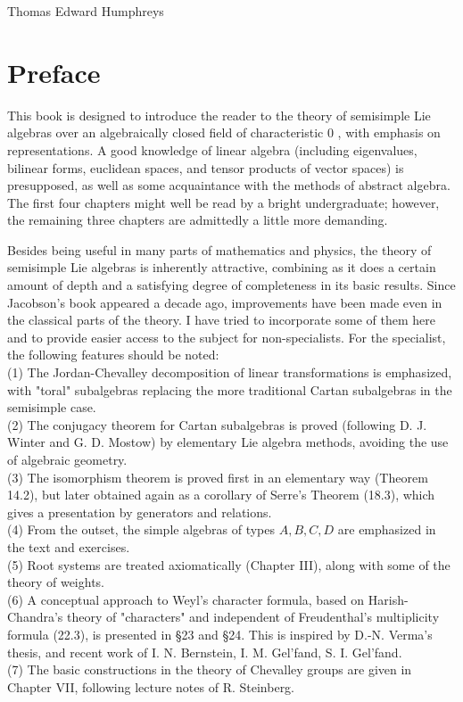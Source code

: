 \documentclass[10pt]{article}
\begin{document}
Thomas Edward Humphreys

\section*{Preface}
This book is designed to introduce the reader to the theory of semisimple Lie algebras over an algebraically closed field of characteristic 0 , with emphasis on representations. A good knowledge of linear algebra (including eigenvalues, bilinear forms, euclidean spaces, and tensor products of vector spaces) is presupposed, as well as some acquaintance with the methods of abstract algebra. The first four chapters might well be read by a bright undergraduate; however, the remaining three chapters are admittedly a little more demanding.

Besides being useful in many parts of mathematics and physics, the theory of semisimple Lie algebras is inherently attractive, combining as it does a certain amount of depth and a satisfying degree of completeness in its basic results. Since Jacobson's book appeared a decade ago, improvements have been made even in the classical parts of the theory. I have tried to incorporate some of them here and to provide easier access to the subject for non-specialists. For the specialist, the following features should be noted:\\
(1) The Jordan-Chevalley decomposition of linear transformations is emphasized, with "toral" subalgebras replacing the more traditional Cartan subalgebras in the semisimple case.\\
(2) The conjugacy theorem for Cartan subalgebras is proved (following D. J. Winter and G. D. Mostow) by elementary Lie algebra methods, avoiding the use of algebraic geometry.\\
(3) The isomorphism theorem is proved first in an elementary way (Theorem 14.2), but later obtained again as a corollary of Serre's Theorem (18.3), which gives a presentation by generators and relations.\\
(4) From the outset, the simple algebras of types $A, B, C, D$ are emphasized in the text and exercises.\\
(5) Root systems are treated axiomatically (Chapter III), along with some of the theory of weights.\\
(6) A conceptual approach to Weyl's character formula, based on Harish-Chandra's theory of "characters" and independent of Freudenthal's multiplicity formula (22.3), is presented in §23 and §24. This is inspired by D.-N. Verma's thesis, and recent work of I. N. Bernstein, I. M. Gel'fand, S. I. Gel'fand.\\
(7) The basic constructions in the theory of Chevalley groups are given in Chapter VII, following lecture notes of R. Steinberg.
\end{document}
